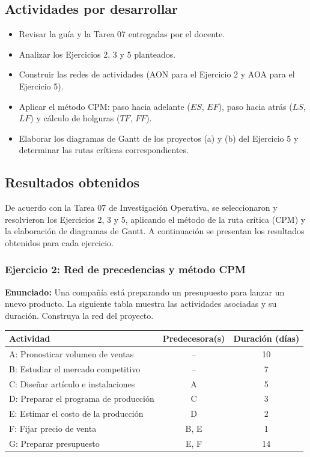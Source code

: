 \documentclass{article}
\begin{document}
\subsection{Actividades por desarrollar}

\begin{itemize}
    \item Revisar la guía y la Tarea 07 entregadas por el docente.
    \item Analizar los Ejercicios 2, 3 y 5 planteados.
    \item Construir las redes de actividades (AON para el Ejercicio 2 y AOA para el Ejercicio 5).
    \item Aplicar el método CPM: paso hacia adelante ($ES$, $EF$), paso hacia atrás ($LS$, $LF$) y cálculo de holguras ($TF$, $FF$).
    \item Elaborar los diagramas de Gantt de los proyectos (a) y (b) del Ejercicio 5 y determinar las rutas críticas correspondientes.
\end{itemize}

\subsection{Resultados obtenidos}

De acuerdo con la Tarea 07 de Investigación Operativa, se seleccionaron y resolvieron los Ejercicios 2, 3 y 5, aplicando el método de la ruta crítica (CPM) y la elaboración de diagramas de Gantt. A continuación se presentan los resultados obtenidos para cada ejercicio.

\subsubsection{Ejercicio 2: Red de precedencias y método CPM}

\textbf{Enunciado:} Una compañía está preparando un presupuesto para lanzar un nuevo producto. La siguiente tabla muestra las actividades asociadas y su duración. Construya la red del proyecto.

\begin{center}
\begin{tabular}{|l|c|c|}
\hline
\textbf{Actividad} & \textbf{Predecesora(s)} & \textbf{Duración (días)} \\
\hline
A: Pronosticar volumen de ventas & -- & 10 \\
B: Estudiar el mercado competitivo & -- & 7 \\
C: Diseñar artículo e instalaciones & A & 5 \\
D: Preparar el programa de producción & C & 3 \\
E: Estimar el costo de la producción & D & 2 \\
F: Fijar precio de venta & B, E & 1 \\
G: Preparar presupuesto & E, F & 14 \\
\hline
\end{tabular}
\end{center}
\end{document}
